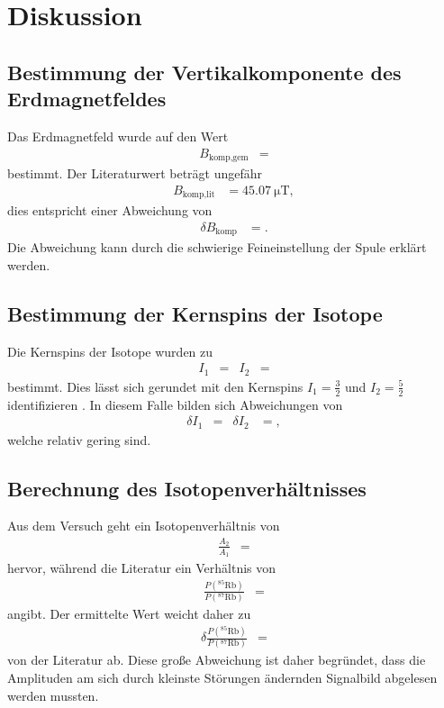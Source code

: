 \section{Diskussion}
\label{sec:Diskussion}

\subsection{Bestimmung der Vertikalkomponente des Erdmagnetfeldes}
Das Erdmagnetfeld wurde auf den Wert
\begin{align*}
  B_\text{komp,gem} &= 
\end{align*}
bestimmt.
Der Literaturwert \cite{magnet} beträgt ungefähr
\begin{align*}
  B_\text{komp,lit} &= \SI{45,07}{\micro\tesla},
\end{align*}
dies entspricht einer Abweichung von
\begin{align*}
  \delta B_\text{komp} &= .
\end{align*}
Die Abweichung kann durch die schwierige Feineinstellung der Spule erklärt werden.%

\subsection{Bestimmung der Kernspins der Isotope}
Die Kernspins der Isotope wurden zu
\begin{align*}
  I_1 &=  & I_2 &= 
\end{align*}
bestimmt.
Dies lässt sich gerundet mit den Kernspins $I_1 = \frac{3}{2}$ und $I_2 = \frac{5}{2}$ identifizieren \cite{iaea}.
In diesem Falle bilden sich Abweichungen von
\begin{align*}
  \delta I_1 &=  & \delta I_2 &= ,
\end{align*}
welche relativ gering sind.

\subsection{Berechnung des Isotopenverhältnisses}
Aus dem Versuch geht ein Isotopenverhältnis von
\begin{align*}
  \frac{A_2}{A_1} &= 
\end{align*}
hervor, während die Literatur ein Verhältnis von
\begin{align*}
  \frac{P\left(^{85}\text{Rb}\right)}{P\left(^{87}\text{Rb}\right)} &= 
\end{align*}
angibt.
Der ermittelte Wert weicht daher zu
\begin{align*}
  \delta \frac{P\left(^{85}\text{Rb}\right)}{P\left(^{87}\text{Rb}\right)} &= 
\end{align*}
von der Literatur ab.
Diese große Abweichung ist daher begründet, dass die Amplituden am sich durch kleinste Störungen ändernden Signalbild abgelesen werden mussten.

